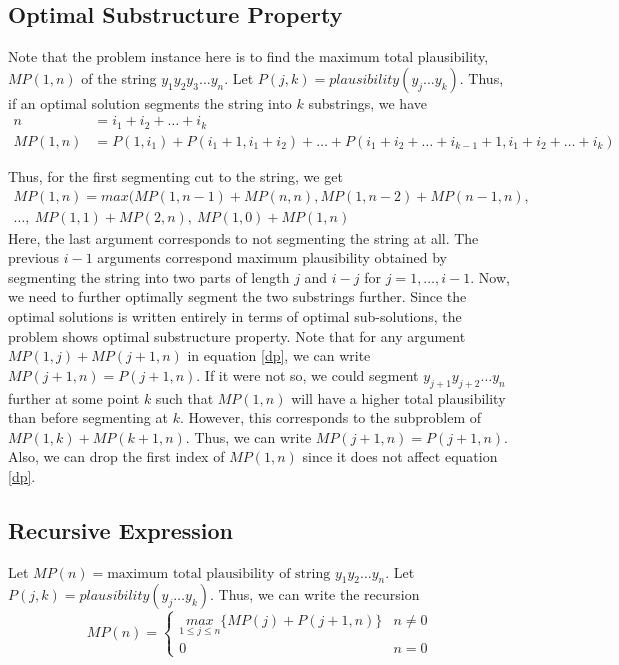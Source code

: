 \documentclass[10pt,a4paper]{article}
\begin{document}
\subsection{Optimal Substructure Property}
Note that the problem instance here is to find the maximum total plausibility, $MP(1, n)$ of the string $y_1y_2y_3\ldots y_n$. Let $P(j,k) = plausibility(y_{j}\ldots y_k)$. Thus, if an optimal solution segments the string into $k$ substrings, we have
\begin{align*}
n &= i_1 + i_2 + \ldots + i_k\\
MP(1, n) &= P(1, i_1) + P(i_1 + 1, i_1 + i_2) + \ldots + P(i_1 + i_2 + \ldots + i_{k-1} + 1, i_1 + i_2 + \ldots + i_{k})
\end{align*}

Thus, for the first segmenting cut to the string, we get
\begin{multline} \label{dp}
MP(1, n) = max(MP(1, n-1) + MP(n, n), MP(1, n-2) + MP(n-1, n),\\ 
\ldots ,\ MP(1, 1) + MP(2, n),\ MP(1, 0) + MP(1, n)
\end{multline}
Here, the last argument corresponds to not segmenting the string at all. The previous $i-1$ arguments correspond maximum plausibility obtained by segmenting the string into two parts of length $j$ and $i-j$ for $j=1,\ldots,i-1$. Now, we need to further optimally segment the two substrings further. Since the optimal solutions is written entirely in terms of optimal sub-solutions, the problem shows optimal substructure property. Note that for any argument $MP(1, j) + MP(j+1, n)$  in equation \ref{dp}, we can write $MP(j+1, n) = P(j+1, n)$. If it were not so, we could segment $y_{j+1}y_{j+2}\ldots y_{n}$ further at some point $k$ such that $MP(1, n)$ will have a higher total plausibility than before segmenting at $k$. However, this corresponds to the subproblem of $MP(1, k) + MP(k+1, n)$. Thus, we can write $MP(j+1, n) = P(j+1, n)$. Also, we can drop the first index of $MP(1, n)$ since it does not affect equation \ref{dp}.

\subsection{Recursive Expression}
Let $MP(n) = \text{maximum total plausibility of string }y_1y_2\ldots y_n$. Let $P(j,k) = plausibility(y_{j}\ldots y_k)$. Thus, we can write the recursion
$$MP(n) = \begin{cases} 
      \underset{1 \leq j \leq n}{max} \big\{ MP(j) + P(j+1, n) \big\} & n\neq 0 \\
      0 & n=0
   \end{cases}
$$
\end{document}
